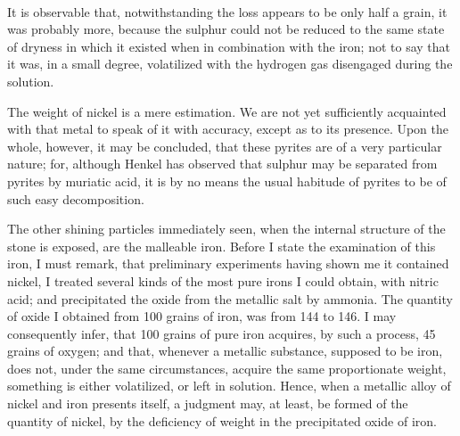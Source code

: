 \documentclass[a4paper, 12pt, oneside, twocolumn]{article}
\begin{document}
\paragraph{}
It is observable that, notwithstanding the loss appears to be only half a grain, it was probably more, because the sulphur could not be reduced to the same state of dryness in which it existed when in combination with the iron; not to say that it was, in a small degree, volatilized with the hydrogen gas disengaged during the solution.

The weight of nickel is a mere estimation. We are not yet sufficiently acquainted with that metal to speak of it with accuracy, except as to its presence. Upon the whole, however, it may be concluded, that these pyrites are of a very particular nature; for, although Henkel has observed that sulphur may be separated from pyrites by muriatic acid, it is by no means the usual habitude of pyrites to be of such easy decomposition.

The other shining particles immediately seen, when the internal structure of the stone is exposed, are the malleable iron. Before I state the examination of this iron, I must remark, that preliminary experiments having shown me it contained nickel, I treated several kinds of the most pure irons I could obtain, with nitric acid; and precipitated the oxide from the metallic salt by ammonia. The quantity of oxide I obtained from 100 grains of iron, was from 144 to 146. I may consequently infer, that 100 grains of pure iron acquires, by such a process, 45 grains of oxygen; and that, whenever a metallic substance, supposed to be iron, does not, under the same circumstances, acquire the same proportionate weight, something is either volatilized, or left in solution. Hence, when a metallic alloy of nickel and iron presents itself, a judgment may, at least, be formed of the quantity of nickel, by the deficiency of weight in the precipitated oxide of iron.
\end{document}
